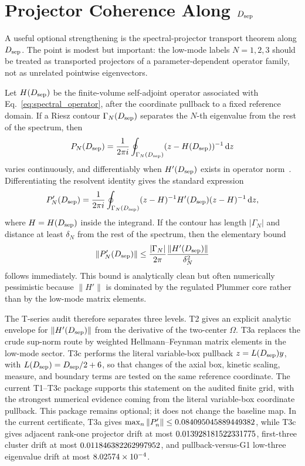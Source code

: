 \documentclass[11pt,a4paper]{article}
\newcommand{\dd}{\mathrm{d}}
\newcommand{\Dsep}{D_{\rm sep}}
\begin{document}
\section{Projector Coherence Along \texorpdfstring{\(\Dsep\)}{Dsep}}
\label{sec:projector_transport}

A useful optional strengthening is the spectral-projector transport theorem along \(\Dsep\).
The point is modest but important: the low-mode labels \(N=1,2,3\) should be treated as transported projectors of a parameter-dependent operator family, not as unrelated pointwise eigenvectors.

Let \(H(\Dsep)\) be the finite-volume self-adjoint operator associated with Eq.~\eqref{eq:spectral_operator}, after the coordinate pullback to a fixed reference domain.
If a Riesz contour \(\Gamma_N(\Dsep)\) separates the \(N\)-th eigenvalue from the rest of the spectrum, then
\begin{equation}
    P_N(\Dsep)=\frac{1}{2\pi i}\oint_{\Gamma_N(\Dsep)}(z-H(\Dsep))^{-1}\,\dd z
    \label{eq:riesz_projector}
\end{equation}
varies continuously, and differentiably when \(H'(\Dsep)\) exists in operator norm~\cite{Kato1995}.
Differentiating the resolvent identity gives the standard expression
\begin{equation}
    P_N'(\Dsep)
    =
    \frac{1}{2\pi i}
    \oint_{\Gamma_N(\Dsep)}
    (z-H)^{-1}H'(\Dsep)(z-H)^{-1}
    \,\dd z,
    \label{eq:projector_derivative}
\end{equation}
where \(H=H(\Dsep)\) inside the integrand.
If the contour has length \(|\Gamma_N|\) and distance at least \(\delta_N\) from the rest of the spectrum, then the elementary bound
\begin{equation}
    \|P_N'(\Dsep)\|
    \le
    \frac{|\Gamma_N|}{2\pi}
    \frac{\|H'(\Dsep)\|}{\delta_N^2}
    \label{eq:projector_derivative_bound}
\end{equation}
follows immediately.
This bound is analytically clean but often numerically pessimistic because \(\|H'\|\) is dominated by the regulated Plummer core rather than by the low-mode matrix elements.

The T-series audit therefore separates three levels.
T2 gives an explicit analytic envelope for \(\|H'(\Dsep)\|\) from the derivative of the two-center \(\Omega\).
T3a replaces the crude sup-norm route by weighted Hellmann--Feynman matrix elements in the low-mode sector.
T3c performs the literal variable-box pullback \(z=L(\Dsep)y\), with \(L(\Dsep)=\Dsep/2+6\), so that changes of the axial box, kinetic scaling, measure, and boundary terms are tested on the same reference coordinate.
The current T1--T3c package supports this statement on the audited finite grid, with the strongest numerical evidence coming from the literal variable-box coordinate pullback.
This package remains optional; it does not change the baseline map.
In the current certificate, T3a gives \(\max_n\|P'_n\|\le 0.084095045889449382\), while T3c gives adjacent rank-one projector drift at most \(0.013928181522331775\), first-three cluster drift at most \(0.011846382262997952\), and pullback-versus-G1 low-three eigenvalue drift at most \(8.02574\times 10^{-4}\).
\end{document}
